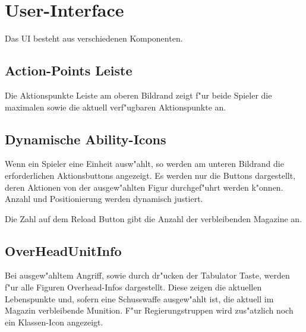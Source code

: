\chapter{User-Interface}
Das UI besteht aus verschiedenen Komponenten.

\section{Action-Points Leiste}
Die Aktionspunkte Leiste am oberen Bildrand zeigt f"ur beide Spieler die maximalen sowie die aktuell verf"ugbaren Aktionspunkte an.

\section{Dynamische Ability-Icons}
Wenn ein Spieler eine Einheit ausw"ahlt, so werden am unteren Bildrand die erforderlichen Aktionsbuttons angezeigt. Es werden nur die Buttons dargestellt, deren Aktionen von der ausgew"ahlten Figur durchgef"uhrt werden k"onnen. Anzahl und Positionierung werden dynamisch justiert. 

Die Zahl auf dem Reload Button gibt die Anzahl der verbleibenden Magazine an.

\section{OverHeadUnitInfo}
Bei ausgew"ahltem Angriff, sowie durch dr"ucken der Tabulator Taste, werden f"ur alle Figuren Overhead-Infos dargestellt. Diese zeigen die aktuellen Lebenspunkte und, sofern eine Schusswaffe ausgew"ahlt ist, die aktuell im Magazin verbleibende Munition. F"ur Regierungstruppen wird zus"atzlich noch ein Klassen-Icon angezeigt.


